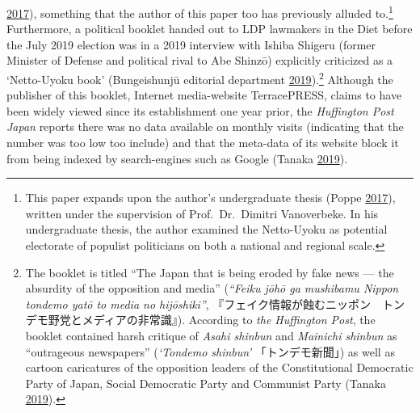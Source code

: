 \documentclass[10pt,british,A4paper,,openany]{memoir}
\begin{document}
\protect\hyperlink{ref-schafer_japans_2017}{2017}), something that the
author of this paper too has previously alluded to.\footnote{This paper
  expands upon the author's undergraduate thesis (Poppe
  \protect\hyperlink{ref-poppe_digitaal_2017}{2017}), written under the
  supervision of Prof.~Dr.~Dimitri Vanoverbeke. In his undergraduate
  thesis, the author examined the Netto-Uyoku as potential electorate of
  populist politicians on both a national and regional scale.}
Furthermore, a political booklet handed out to LDP lawmakers in the Diet
before the July 2019 election was in a 2019 interview with Ishiba
Shigeru (former Minister of Defense and political rival to Abe Shinzō)
explicitly criticized as a `Netto-Uyoku book' (Bungeishunjū editorial
department
\protect\hyperlink{ref-bungeishunju_editorial_department_eng._2019}{2019}).\footnote{The
  booklet is titled ``The Japan that is being eroded by fake news ---
  the absurdity of the opposition and media'' (\emph{``Feiku jōhō ga
  mushibamu Nippon tondemo yatō to media no hijōshiki''},
  『フェイク情報が蝕むニッポン　トンデモ野党とメディアの非常識』).
  According to \emph{the Huffington Post}, the booklet contained harsh
  critique of \emph{Asahi shinbun} and \emph{Mainichi shinbun} as
  ``outrageous newspapers'' (\emph{`Tondemo shinbun'} 「トンデモ新聞」)
  as well as cartoon caricatures of the opposition leaders of the
  Constitutional Democratic Party of Japan, Social Democratic Party and
  Communist Party (Tanaka
  \protect\hyperlink{ref-tanaka_eng._2019}{2019}).} Although the
publisher of this booklet, Internet media-website TerracePRESS, claims
to have been widely viewed since its establishment one year prior, the
\emph{Huffington Post Japan} reports there was no data available on
monthly visits (indicating that the number was too low too include) and
that the meta-data of its website block it from being indexed by
search-engines such as Google (Tanaka
\protect\hyperlink{ref-tanaka_eng._2019}{2019}).
\end{document}
